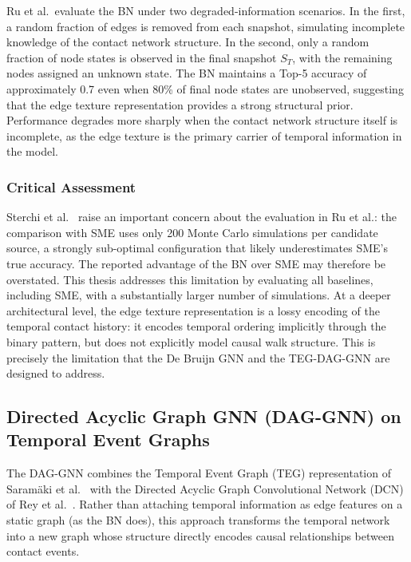 Ru et al.\ evaluate the BN under two degraded-information scenarios. In the first, a random fraction of edges is removed from each snapshot, simulating incomplete knowledge of the contact network structure. In the second, only a random fraction of node states is observed in the final snapshot $S_T$, with the remaining nodes assigned an unknown state. The BN maintains a Top-5 accuracy of approximately 0.7 even when 80\% of final node states are unobserved, suggesting that the edge texture representation provides a strong structural prior. Performance degrades more sharply when the contact network structure itself is incomplete, as the edge texture is the primary carrier of temporal information in the model.

\subsubsection{Critical Assessment}
\label{sssec:bn-assessment}

Sterchi et al.~\cite{Sterchi2025} raise an important concern about the evaluation in Ru et al.: the comparison with SME uses only 200 Monte Carlo simulations per candidate source, a strongly sub-optimal configuration that likely underestimates SME's true accuracy. The reported advantage of the BN over SME may therefore be overstated. This thesis addresses this limitation by evaluating all baselines, including SME, with a substantially larger number of simulations. At a deeper architectural level, the edge texture representation is a lossy encoding of the temporal contact history: it encodes temporal ordering implicitly through the binary pattern, but does not explicitly model causal walk structure. This is precisely the limitation that the De Bruijn GNN and the TEG-DAG-GNN are designed to address.

\subsection{Directed Acyclic Graph GNN (DAG-GNN) on Temporal Event Graphs}
\label{ssst:dagmodel}

The DAG-GNN combines the Temporal Event Graph (TEG) representation of Saram\"aki et al.~\cite{Saramaki2019} with the Directed Acyclic Graph Convolutional Network (DCN) of Rey et al.~\cite{Rey2025}. Rather than attaching temporal information as edge features on a static graph (as the BN does), this approach transforms the temporal network into a new graph whose structure directly encodes causal relationships between contact events.

